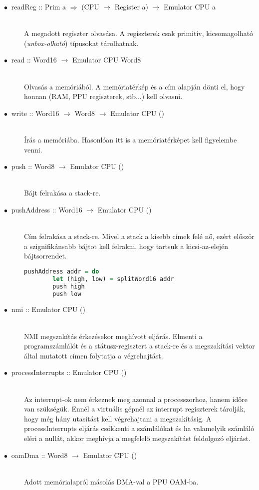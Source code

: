 \begin{description}
	\item[$\bullet\:$ readReg :: Prim a $\Rightarrow$ (CPU $\rightarrow$ Register a) $\rightarrow$ Emulator CPU a] \hfill \\
	A megadott regiszter olvasása. A regiszterek csak primitív, kicsomagolható (\emph{unbox-olható}) típusokat tárolhatnak.
	\item[$\bullet\:$ read :: Word16 $\rightarrow$ Emulator CPU Word8] \hfill \\
	Olvasás a memóriából. A memóriatérkép és a cím alapján dönti el, hogy honnan (RAM, PPU regiszterek, stb...) kell olvasni.
	\item[$\bullet\:$ write :: Word16 $\rightarrow$ Word8 $\rightarrow$ Emulator CPU ()] \hfill \\
	Írás a memóriába. Hasonlóan itt is a memóriatérképet kell figyelembe venni.
	\item[$\bullet\:$ push :: Word8 $\rightarrow$ Emulator CPU ()] \hfill \\
	Bájt felrakása a stack-re.
	\item[$\bullet\:$ pushAddress :: Word16 $\rightarrow$ Emulator CPU ()] \hfill \\
	Cím felrakása a stack-re. Mivel a stack a kisebb címek felé nő, ezért először a szignifikánsabb bájtot kell felrakni, hogy tartsuk a kicsi-az-elején bájtsorrendet.
	\begin{lstlisting}[language=Haskell]
	pushAddress addr = do
		let (high, low) = splitWord16 addr 
		push high
		push low
	\end{lstlisting}
	\item[$\bullet\:$ nmi :: Emulator CPU ()] \hfill \\
	NMI megszakítás érkezésekor meghívott eljárás. Elmenti a programszámlálót és a státusz-regisztert a stack-re és a megszakítási vektor által mutatott címen folytatja a végrehajtást.
	\item[$\bullet\:$ processInterrupts :: Emulator CPU ()] \hfill \\
	Az interrupt-ok nem érkeznek meg azonnal a processzorhoz, hanem időre van szükségük.
	Ennél a virtuális gépnél az interrupt regiszterek tárolják, hogy még hány utasítást kell végrehajtani a megszakításig. A processInterrupts eljárás csökkenti a számlálókat és ha valamelyik számláló eléri a nullát, akkor meghívja a megfelelő megszakítást feldolgozó eljárást. 
	\item[$\bullet\:$ oamDma :: Word8 $\rightarrow$ Emulator CPU ()] \hfill \\
	Adott memórialapról másolás DMA-val a PPU OAM-ba.
\end{description}

